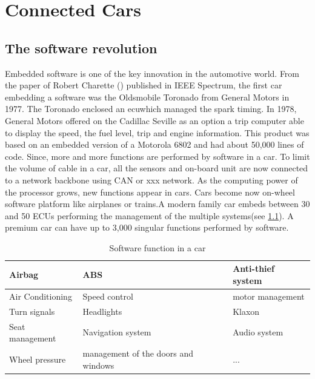 
\chapter{Connected Cars} \label{CARS}
\smallskip
\hfill
\begin{minipage}[b]{8cm}
\end{minipage}
\vskip 2cm


\section {The software revolution}
\medskip
{\Huge E}mbedded software is one of the key innovation in the automotive world. From the paper of
 Robert Charette (\cite{Cha2009}) published in IEEE Spectrum, the first car embedding a software was the Oldsmobile Toronado from General Motors in 1977. The Toronado enclosed an \gls{ecu}\@ which managed the spark timing. In 1978, General Motors offered on the Cadillac Seville as an option a trip computer able to display the speed, the fuel level, trip and engine information. This product was based on an embedded version of a Motorola 6802 and had about 50,000 lines of code. Since, more and more functions are performed by software in a car. To limit the volume of cable in a car, all the sensors and on-board unit are now connected to a network backbone using CAN or xxx network. As the computing power of the processor grows, new functions appear in cars. Cars become now on-wheel software platform like airplanes or trains.A modern family car embeds between 30 and 50 ECUs performing the management of the multiple systems(see \ref{tab:soft}). A premium car can have up to 3,000 singular functions performed by software.   

\FloatBarrier
\begin{table}
\centering
\begin{tabular}{| l | l | l |}
\hline
Airbag & ABS & Anti-thief system \\
\hline
Air Conditioning & Speed control & motor management \\
\hline
Turn signals & Headlights & Klaxon \\
\hline
Seat management & Navigation system & Audio system\\
\hline
Wheel pressure & management of the doors and windows & ... \\
\hline
\end{tabular}
\caption{Software function in a car}
\label{tab:soft}
\end{table}
\FloatBarrier


